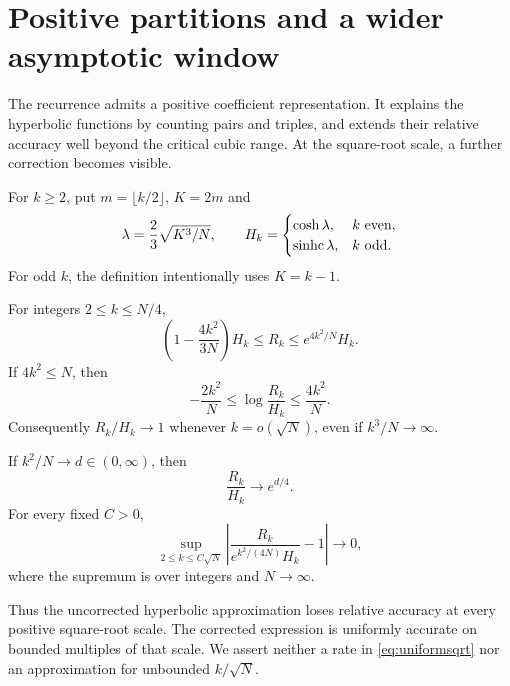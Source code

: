 \section{Positive partitions and a wider asymptotic window}\label{sec:extension}

The recurrence admits a positive coefficient representation. It explains the hyperbolic functions by counting pairs and triples, and extends their relative accuracy well beyond the critical cubic range. At the square-root scale, a further correction becomes visible.

For $k\ge2$, put $m=\lfloor k/2\rfloor$, $K=2m$ and
\begin{equation}\label{eq:hyperdef}
\lambda=\frac23\sqrt{K^3/N},\qquad
H_k=\begin{cases}\cosh\lambda,&k\text{ even},\\
\operatorname{sinhc}\lambda,&k\text{ odd}.
\end{cases}
\end{equation}
For odd $k$, the definition intentionally uses $K=k-1$.



\begin{theorem}\label{thm:window}
For integers $2\le k\le N/4$,
\begin{equation}\label{eq:envelope}
\left(1-\frac{4k^2}{3N}\right)H_k
\le R_k\le e^{4k^2/N}H_k.
\end{equation}
If $4k^2\le N$, then
\begin{equation}\label{eq:logerror}
-\frac{2k^2}N\le\log\frac{R_k}{H_k}\le\frac{4k^2}N.
\end{equation}
Consequently $R_k/H_k\to1$ whenever $k=o(\sqrt N)$, even if $k^3/N\to\infty$.
\end{theorem}

\begin{theorem}\label{thm:sqrt}
If $k^2/N\to d\in(0,\infty)$, then
\begin{equation}\label{eq:sqrtlimit}
\frac{R_k}{H_k}\longrightarrow e^{d/4}.
\end{equation}
For every fixed $C>0$,
\begin{equation}\label{eq:uniformsqrt}
\sup_{2\le k\le C\sqrt N}
\left|\frac{R_k}{e^{k^2/(4N)}H_k}-1\right|\longrightarrow0,
\end{equation}
where the supremum is over integers and $N\to\infty$.
\end{theorem}

Thus the uncorrected hyperbolic approximation loses relative accuracy at every positive square-root scale. The corrected expression is uniformly accurate on bounded multiples of that scale. We assert neither a rate in \eqref{eq:uniformsqrt} nor an approximation for unbounded $k/\sqrt N$.

